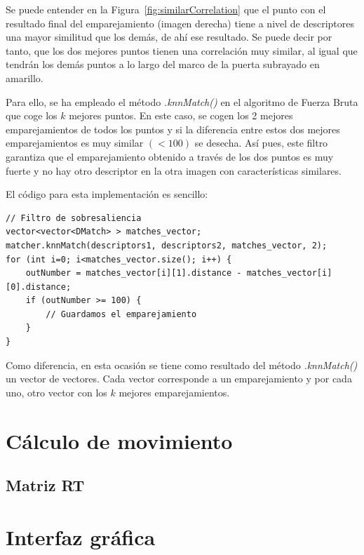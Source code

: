 \begin{itemize}
Se puede entender en la Figura~\ref{fig:similarCorrelation} que el punto con el resultado final del emparejamiento (imagen derecha) tiene a nivel de descriptores una mayor similitud que los demás, de ahí ese resultado. Se puede decir por tanto, que los dos mejores puntos tienen una correlación muy similar, al igual que tendrán los demás puntos a lo largo del marco de la puerta subrayado en amarillo.

Para ello, se ha empleado el método \textit{.knnMatch()} en el algoritmo de Fuerza Bruta que coge los $k$ mejores puntos. En este caso, se cogen los 2 mejores emparejamientos de todos los puntos y si la diferencia entre estos dos mejores emparejamientos es muy similar $(< 100)$ se desecha. Así pues, este filtro garantiza que el emparejamiento obtenido a través de los dos puntos es muy fuerte y no hay otro descriptor en la otra imagen con características similares.

El código para esta implementación es sencillo:

\begin{lstlisting}[style=CStyle]
// Filtro de sobresaliencia
vector<vector<DMatch> > matches_vector;
matcher.knnMatch(descriptors1, descriptors2, matches_vector, 2);
for (int i=0; i<matches_vector.size(); i++) {
	outNumber = matches_vector[i][1].distance - matches_vector[i][0].distance;
	if (outNumber >= 100) {
		// Guardamos el emparejamiento
	}
}
\end{lstlisting}

Como diferencia, en esta ocasión se tiene como resultado del método \textit{.knnMatch()} un vector de vectores. Cada vector corresponde a un emparejamiento y por cada uno, otro vector con los $k$ mejores emparejamientos.

\end{itemize}


\section{Cálculo de movimiento}

\subsection{Matriz RT}

\section{Interfaz gráfica}
